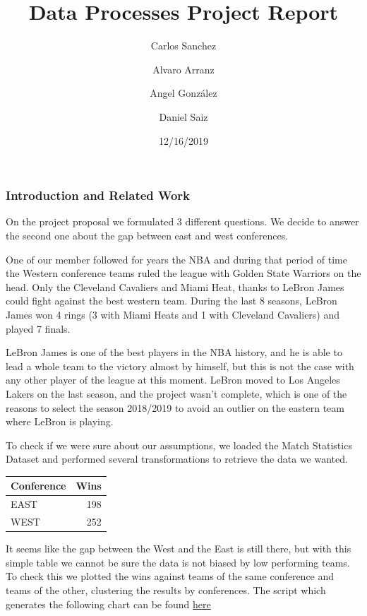 \documentclass[
]{article}
\title{Data Processes Project Report}
\author{Carlos Sanchez \and Alvaro Arranz \and Angel González \and Daniel Saiz}
\date{12/16/2019}
\begin{document}
\maketitle

\hypertarget{introduction-and-related-work}{%
\subsubsection{Introduction and Related
Work}\label{introduction-and-related-work}}

On the project proposal we formulated 3 different questions. We decide
to answer the second one about the gap between east and west
conferences.

One of our member followed for years the NBA and during that period of
time the Western conference teams ruled the league with Golden State
Warriors on the head. Only the Cleveland Cavaliers and Miami Heat,
thanks to LeBron James could fight against the best western team. During
the last 8 seasons, LeBron James won 4 rings (3 with Miami Heats and 1
with Cleveland Cavaliers) and played 7 finals.

LeBron James is one of the best players in the NBA history, and he is
able to lead a whole team to the victory almost by himself, but this is
not the case with any other player of the league at this moment. LeBron
moved to Los Angeles Lakers on the last season, and the project wasn't
complete, which is one of the reasons to select the season 2018/2019 to
avoid an outlier on the eastern team where LeBron is playing.

To check if we were sure about our assumptions, we loaded the Match
Statistics Dataset and performed several transformations to retrieve the
data we wanted.

\begin{longtable}[]{@{}lr@{}}
\toprule
Conference & Wins\tabularnewline
\midrule
\endhead
EAST & 198\tabularnewline
WEST & 252\tabularnewline
\bottomrule
\end{longtable}

It seems like the gap between the West and the East is still there, but
with this simple table we cannot be sure the data is not biased by low
performing teams. To check this we plotted the wins against teams of the
same conference and teams of the other, clustering the results by
conferences. The script which generates the following chart can be found
\href{https://github.com/AlmaProcesses/NBA_Project/blob/master/question_2.R}{here}
\end{document}
